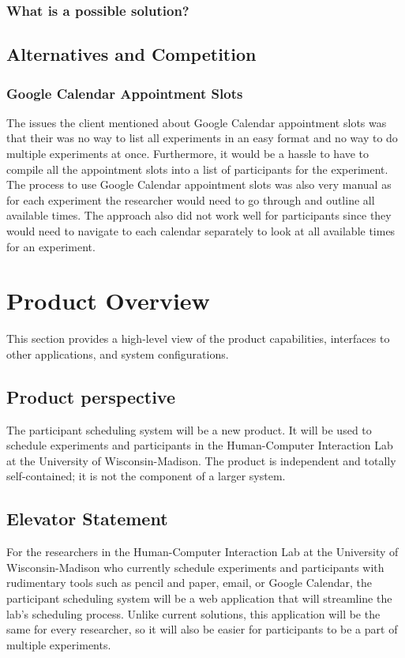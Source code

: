 \documentclass{article}
\begin{document}
\subsubsection{What is a possible solution?}

\subsection{Alternatives and Competition}
\subsubsection{Google Calendar Appointment Slots}
The issues the client mentioned about Google Calendar appointment slots was that their was no way to list all experiments in an easy format and no way to do multiple experiments at once. Furthermore, it would be a hassle to have to compile all the appointment slots into a list of participants for the experiment. The process to use Google Calendar appointment slots was also very manual as for each experiment the researcher would need to go through and outline all available times. The approach also did not work well for participants since they would need to navigate to each calendar separately to look at all available times for an experiment.

\section{Product Overview}
This section provides a high-level view of the product capabilities, interfaces to other applications, and system configurations.

\subsection{Product perspective}
The participant scheduling system will be a new product. It will be used to schedule experiments and participants in the Human-Computer Interaction Lab at the University of Wisconsin-Madison. The product is independent and totally self-contained; it is not the component of a larger system.

\subsection{Elevator Statement}
For the researchers in the Human-Computer Interaction Lab at the University of Wisconsin-Madison who currently schedule experiments and participants with rudimentary tools such as pencil and paper, email, or Google Calendar, the participant scheduling system will be a web application that will streamline the lab's scheduling process. Unlike current solutions, this application will be the same for every researcher, so it will also be easier for participants to be a part of multiple experiments.
\end{document}
